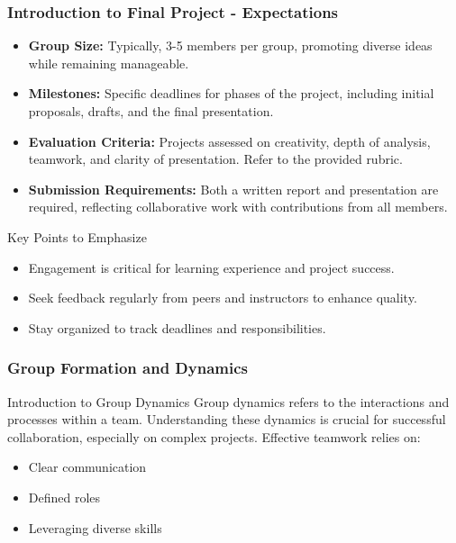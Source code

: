 \documentclass[aspectratio=169]{beamer}
\begin{document}
\begin{frame}[fragile]
    \frametitle{Introduction to Final Project - Expectations}
    \begin{itemize}
        \item \textbf{Group Size:} Typically, 3-5 members per group, promoting diverse ideas while remaining manageable.
        
        \item \textbf{Milestones:} Specific deadlines for phases of the project, including initial proposals, drafts, and the final presentation.
        
        \item \textbf{Evaluation Criteria:} Projects assessed on creativity, depth of analysis, teamwork, and clarity of presentation. Refer to the provided rubric.
        
        \item \textbf{Submission Requirements:} Both a written report and presentation are required, reflecting collaborative work with contributions from all members.
    \end{itemize}
    
    \begin{block}{Key Points to Emphasize}
        \begin{itemize}
            \item Engagement is critical for learning experience and project success.
            \item Seek feedback regularly from peers and instructors to enhance quality.
            \item Stay organized to track deadlines and responsibilities.
        \end{itemize}
    \end{block}
\end{frame}

\begin{frame}[fragile]
    \frametitle{Group Formation and Dynamics}
    \begin{block}{Introduction to Group Dynamics}
        Group dynamics refers to the interactions and processes within a team.
        Understanding these dynamics is crucial for successful collaboration, especially on complex projects.
        Effective teamwork relies on:
        \begin{itemize}
            \item Clear communication
            \item Defined roles
            \item Leveraging diverse skills
        \end{itemize}
    \end{block}
\end{frame}
\end{document}
